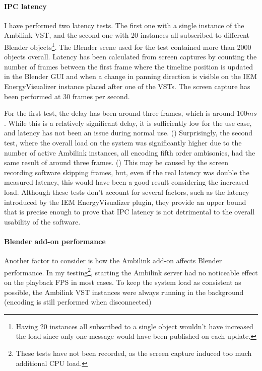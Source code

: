 \paragraph*{IPC latency}
I have performed two latency tests. The first one with a single instance of the Ambilink VST,
and the second one with 20 instances all subscribed to different
Blender objects\footnote{Having 20 instances all subscribed to a single object wouldn't have
increased the load since only one  message
would have been published on each update.}.
The Blender scene used for the test contained more than 2000 objects overall.
Latency has been calculated from screen captures by counting the number of frames
between the first frame where the timeline position is updated in the Blender GUI
and when a change in panning direction is visible on the IEM EnergyVisualizer instance placed after one of the VSTs.
The screen capture has been performed at 30 frames per second.

For the first test, the delay has been around three frames, which is around $100ms$.
While this is a relatively significant delay, it is sufficiently low for the use case, 
and latency has not been an issue during normal use.
()
Surprisingly, the second test, where the overall load on the system was significantly higher 
due to the number of active Ambilink instances, all encoding fifth order ambisonics, had the same 
result of around three frames. ()
This may be caused by the screen recording software skipping frames, but, even if the real latency 
was double the measured latency, this would have been a good result considering the increased load. 
Although these tests don't account for several factors, such as
the latency introduced by the IEM EnergyVisualizer plugin, they provide an upper bound
that is precise enough to prove that IPC latency is not detrimental to the overall usability of the software.

\paragraph*{Blender add-on performance}
Another factor to consider is how the Ambilink add-on affects Blender performance.
In my testing\footnote{
    These tests have not been recorded, as the screen capture induced too much additional CPU load.
}, starting the Ambilink server had no noticeable effect on the playback FPS in most cases.
To keep the system load as consistent as possible, the Ambilink VST instances were always running in the 
background (encoding is still performed when disconnected)

